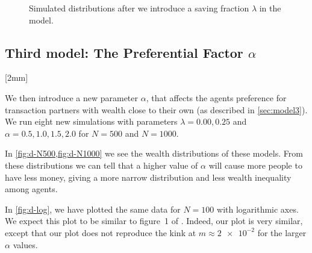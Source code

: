 \documentclass[12pt,a4paper]{article}
\newcommand\oppg[1]{\reversemarginnote{\textcolor{black!40}{#1)}}[2mm]}
\begin{document}
\begin{figure}[!ht]
  \centering

  \caption{Simulated distributions after we introduce a saving fraction $\lambda$ in the model.} \label{fig:c}
\end{figure}

\subsection{Third model: The Preferential Factor $\alpha$}
\oppg{d}

We then introduce a new parameter $\alpha$, that affects the agents preference for transaction partners with wealth close to their own (as described in \cref{sec:model3}). We run eight new simulations with parameters $\lambda = 0.00,0.25$ and $\alpha = 0.5,1.0,1.5,2.0$ for $N = 500$ and $N = 1000$.

In \cref{fig:d-N500,fig:d-N1000} we see the wealth distributions of these models. From these distributions we can tell that a higher value of $\alpha$ will cause more people to have less money, giving a more narrow distribution and less wealth inequality among agents.

In \cref{fig:d-log}, we have plotted the same data for $N = 100$ with logarithmic axes.
We expect this plot to be similar to figure~1 of \textcite{goswami-sen}. Indeed, our plot is very similar, except that our plot does not reproduce the kink at $m \approx \num{2e-2}$ for the larger $\alpha$ values.
\end{document}
